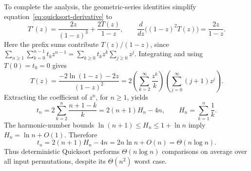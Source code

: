 \documentclass[11pt]{article}
\begin{document}
To complete the analysis, the geometric-series identities simplify
 equation~\eqref{eq:quicksort-derivative} to
\[
 T'(z)=\frac{2z}{(1-z)^3}+\frac{2T(z)}{1-z},
 \qquad
 \frac{d}{dz}\bigl((1-z)^2T(z)\bigr)=\frac{2z}{1-z}.
\]
Here the prefix sums contribute $T(z)/(1-z)$, since
$\sum_{n\geq1}\sum_{k=0}^{n-1}t_kz^{n-1}
=\sum_{k\geq0}t_kz^k\sum_{j\geq0}z^j$.
Integrating and using $T(0)=t_0=0$ gives
\[
 T(z)=\frac{-2\ln(1-z)-2z}{(1-z)^2}
     =2\left(\sum_{k=2}^{\infty}\frac{z^k}{k}\right)
        \left(\sum_{j=0}^{\infty}(j+1)z^j\right).
\]
Extracting the coefficient of $z^n$, for $n\geq1$, yields
\[
 t_n=2\sum_{k=2}^{n}\frac{n+1-k}{k}
     =2(n+1)H_n-4n,
 \qquad H_n=\sum_{k=1}^{n}\frac1k.
\]
The harmonic-number bounds $\ln(n+1)\leq H_n\leq1+\ln n$ imply
$H_n=\ln n+O(1)$. Therefore
\[
 \boxed{t_n=2(n+1)H_n-4n=2n\ln n+O(n)=\Theta(n\log n).}
\]
Thus deterministic Quicksort performs $\Theta(n\log n)$ comparisons on average
 over all input permutations, despite its $\Theta(n^2)$ worst case.
\end{document}
